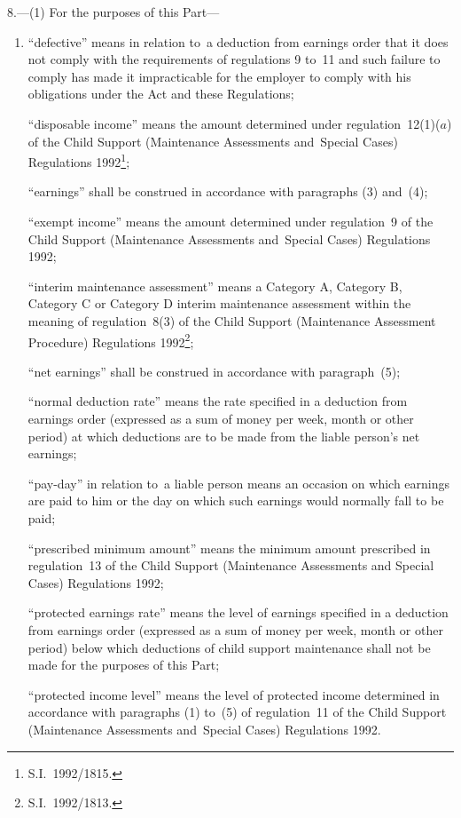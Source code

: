\documentclass[12pt,a4paper]{article}
\begin{document}
8.—(1) For the purposes of this Part—
\begin{enumerate}\item[]
“defective” means in relation to~a deduction from earnings order that it does not comply with the requirements of regulations 9 to~11 and such failure to comply has made it impracticable for the employer to comply with his obligations under the Act and these Regulations;

\begin{sloppypar}
“disposable income” means the amount determined under 
regulation~12(1)($a$)  %
of the Child Support (Maintenance Assessments and~Special Cases) Regulations 1992\footnote{\frenchspacing S.I.~1992/1815.};
\end{sloppypar}

“earnings” shall be construed in accordance with paragraphs (3) and~(4);

“exempt income” means the amount determined under regulation~9 of the Child Support (Maintenance Assessments and~Special Cases) Regulations 1992;

\pagebreak[3]

“interim maintenance assessment” means a Category A, Category B, Category C or Category D interim maintenance assessment within the meaning of 
regulation~8(3)  %
of the Child Support (Maintenance Assessment Procedure) Regulations 1992\footnote{\frenchspacing S.I.~1992/1813.};

“net earnings” shall be construed in accordance with paragraph~(5);

“normal deduction rate” means the rate specified in a deduction from earnings order (expressed as a sum of money per week, month or other period) at which deductions are to be made from the liable person’s net earnings;

“pay-day” in relation to~a liable person means an occasion on which earnings are paid to him or the day on which such earnings would normally fall to be paid;

“prescribed minimum amount” means the minimum amount prescribed in regulation~13 of the Child Support (Maintenance Assessments and Special Cases) Regulations 1992;

“protected earnings rate” means the level of earnings specified in a deduction from earnings order (expressed as a sum of money per week, month or other period) below which deductions of child support maintenance shall not be made for the purposes of this Part;

“protected income level” means the level of protected income determined in accordance with 
paragraphs (1) to~(5) of  %
regulation~11 of the Child Support (Maintenance Assessments and~Special Cases) Regulations 1992.
\end{enumerate}
\end{document}
